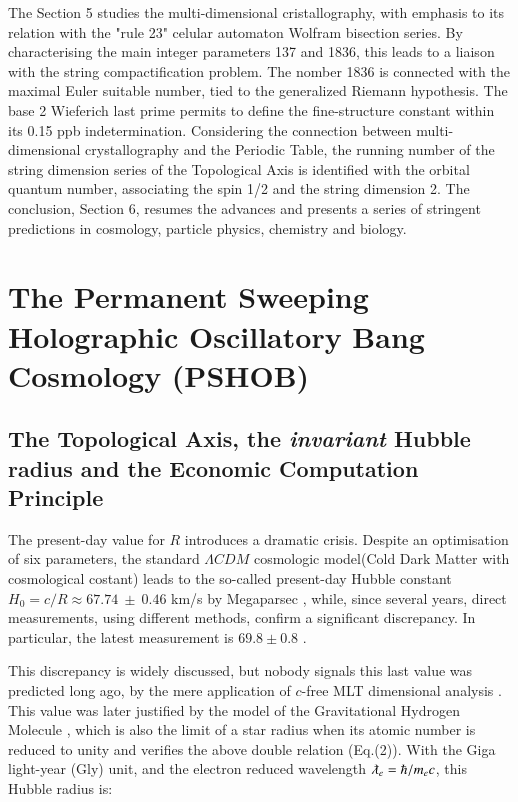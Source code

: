 \documentclass[a4paper,9pt]{article}
\begin{document}
The Section 5 studies the multi-dimensional cristallography, with emphasis to its relation with the "rule 23" celular automaton Wolfram bisection series. By characterising the main integer parameters 137 and 1836, this leads to a liaison with the string compactification problem. The nomber 1836 is connected with the maximal Euler suitable number, tied to the generalized Riemann hypothesis. The base 2 Wieferich last prime permits to define the fine-structure constant within its 0.15 ppb indetermination. Considering the connection between multi-dimensional crystallography and the Periodic Table, the running number of the string dimension series of the Topological Axis is identified with the orbital quantum number, associating the spin 1/2 and the string dimension 2. The conclusion, Section 6, resumes the advances and presents a series of stringent predictions in cosmology, particle physics, chemistry and biology.

%


%

\section{The Permanent Sweeping Holographic Oscillatory Bang Cosmology (PSHOB)}

\subsection{The Topological Axis, the \textit{invariant} Hubble radius and the Economic Computation Principle}\label{AxeTopologique}

The present-day value for $R$ introduces a dramatic crisis. Despite an optimisation of six parameters, the standard $\Lambda CDM$ cosmologic model(Cold Dark Matter with cosmological costant) leads to the so-called present-day Hubble constant $ H_0 = c/R \approx 67.74 ~\pm~ 0.46$ km/s by Megaparsec \cite{Zyla}, while, since several years, direct measurements, using different methods, confirm a significant discrepancy. In particular, the latest measurement is $69.8 \pm 0.8$ \cite{Freedman}. 

This discrepancy is widely discussed, but nobody signals this last value was predicted long ago, by the mere application of $c$-free MLT dimensional analysis \cite{Sanchez3}. This value was later justified by the model of the Gravitational Hydrogen Molecule \cite{Sanchez5}, which is also the limit of a star radius when its atomic number is reduced to unity \cite{Davies} and verifies the above double relation (Eq.(2)). With the Giga light-year (Gly) unit, and the electron reduced wavelength $\lambdabar_e = \hbar/m_ec$, this Hubble radius is:
\end{document}
